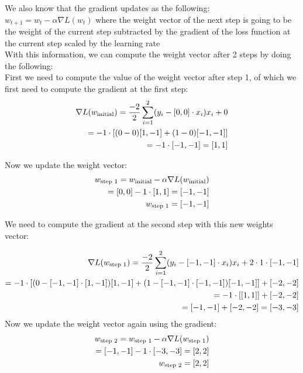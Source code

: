 \documentclass[12pt]{article}
\begin{document}
\begin{enumerate}
\begin{enumerate}
   We also know that the gradient updates as the following: $w_{t+1} = w_t - \alpha \nabla L(w_t)$ where the weight vector of the next step is going to be the weight of the current step subtracted by the gradient of the loss function at the current step scaled by the learning rate\\

   With this information, we can compute the weight vector after 2 steps by doing the following: \\ 

   First we need to compute the value of the weight vector after step 1, of which we first need to compute the gradient at the first step: \\ 
   \begin{align}
    \nabla L(w_{\text{initial}}) = \frac{-2}{2} \sum_{i=1}^{2} (y_i - [0,0] \cdot x_i) x_i + 0 \notag \\ 
    = -1 \cdot [(0 - 0)[1,-1] + (1-0)[-1,-1]] \notag \\ 
    = -1 \cdot [-1,-1] = [1,1] \notag 
   \end{align}

   Now we update the weight vector: \\ 
   \begin{align}
    w_{\text{step 1}} = w_{\text{initial}} - \alpha \nabla L(w_{\text{initial}}) \notag \\ 
    = [0,0] - 1 \cdot [1,1] = [-1,-1] \notag \\ 
    w_{\text{step 1}} = [-1,-1] \notag
   \end{align}

   We need to compute the gradient at the second step with this new weights vector:

   \begin{align}
    \nabla L(w_{\text{step 1}}) = \frac{-2}{2} \sum_{i=1}^{2} (y_i - [-1,-1] \cdot x_i) x_i + 2 \cdot 1 \cdot [-1,-1] \notag \\ 
    = -1 \cdot [(0 - [-1,-1] \cdot [1,-1])[1,-1] + (1 - [-1,-1] \cdot [-1,-1])[-1,-1]] + [-2,-2] \notag \\ 
    = -1 \cdot [[1,1]] + [-2,-2] \notag \\ 
    = [-1,-1] + [-2,-2] = [-3,-3] \notag 
   \end{align}
   Now we update the weight vector again using the gradient: \\ 
   \begin{align}
    w_{\text{step 2}} = w_{\text{step 1}} - \alpha \nabla L(w_{\text{step 1}}) \notag \\ 
    = [-1,-1] - 1 \cdot [-3,-3] = [2,2] \notag \\ 
    w_{\text{step 2}} = [2,2] \notag
   \end{align}


\end{enumerate}
\end{enumerate}
\end{document}
